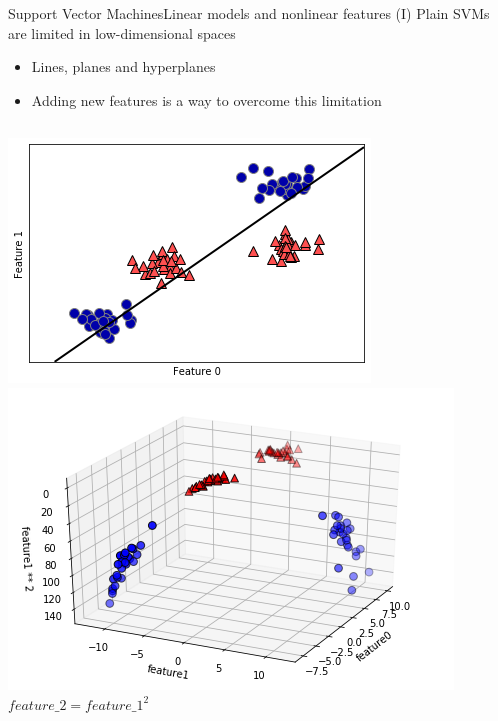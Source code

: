 \documentclass[10pt,compress]{beamer} %
\begin{document}
\begin{frame}{Support Vector Machines}{Linear models and nonlinear features (I)}
    Plain SVMs are limited in low-dimensional spaces
    \begin{itemize}
        \item Lines, planes and hyperplanes
        \item Adding new features is a way to overcome this limitation
    \end{itemize}

    \begin{columns}[T]
            \includegraphics[width=\linewidth]{figs/svm-1.png}
            \includegraphics[width=\linewidth]{figs/svm-2.png}
            \centering $feature\_2 = feature\_1^2$
    \end{columns}
\end{frame}
\end{document}
